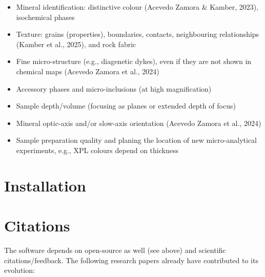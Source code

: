 	\begin{itemize}
		
		\item Mineral identification: distinctive colour (Acevedo Zamora & Kamber, 2023), isochemical phases
		\item Texture: grains (properties), boundaries, contacts, neighbouring relationships (Kamber et al., 2025), and rock fabric
		\item Fine micro-structure (e.g., diagenetic dykes), even if they are not shown in chemical maps (Acevedo Zamora et al., 2024)
		\item Accessory phases and micro-inclusions (at high magnification)
		\item Sample depth/volume (focusing as planes or extended depth of focus)
		\item Mineral optic-axis and/or slow-axis orientation (Acevedo Zamora et al., 2024)
		\item Sample preparation quality and planing the location of new micro-analytical experiments, e.g., XPL colours depend on thickness
	
	\end{itemize}
	
	
	\section{Installation}
		
	\section{Citations}
	
	The software depends on open-source as well (see above) and scientific citations/feedback. The following research papers already have contributed to its evolution:
	
